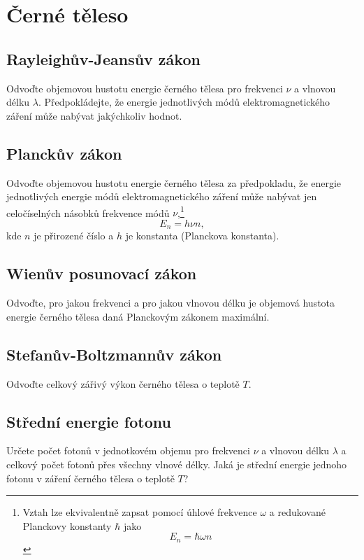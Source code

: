\section{Černé těleso}
\subsection{Rayleighův-Jeansův zákon}
    Odvoďte objemovou hustotu energie černého tělesa pro frekvenci $\nu$ a vlnovou délku $\lambda$.
    Předpokládejte, že energie jednotlivých módů elektromagnetického záření může nabývat jakýchkoliv hodnot.

\subsection{Planckův zákon}
    Odvoďte objemovou hustotu energie černého tělesa za předpokladu, že energie jednotlivých energie módů elektromagnetického záření může nabývat jen celočíselných násobků frekvence módů $\nu$,\footnote{
        Vztah lze ekvivalentně zapsat pomocí úhlové frekvence $\omega$ a redukované Planckovy konstanty $\hbar$ jako
        \begin{equation}
            E_{n}=\hbar\omega n
        \end{equation}
    }
    \begin{equation*}
        E_{n}=h\nu n,
    \end{equation*}
    kde $n$ je přirozené číslo a $h$ je konstanta (Planckova konstanta).

\subsection{Wienův posunovací zákon}
    Odvoďte, pro jakou frekvenci a pro jakou vlnovou délku je objemová hustota energie černého tělesa daná Planckovým zákonem maximální.

\subsection{Stefanův-Boltzmannův zákon}
    Odvoďte celkový zářivý výkon černého tělesa o teplotě $T$.

\subsection{Střední energie fotonu}
    Určete počet fotonů v jednotkovém objemu pro frekvenci $\nu$ a vlnovou délku $\lambda$ a celkový počet fotonů přes všechny vlnové délky.
    Jaká je střední energie jednoho fotonu v záření černého tělesa o teplotě $T$?

